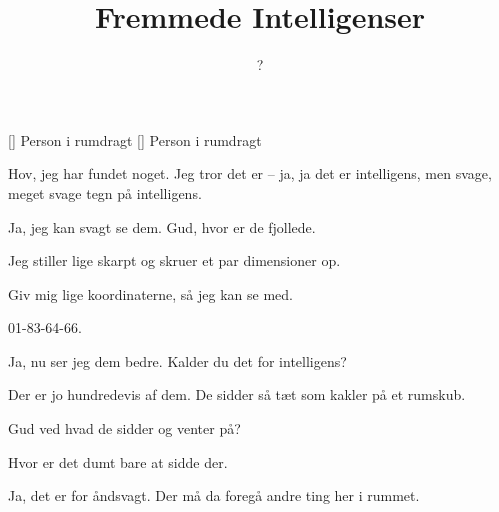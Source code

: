 \documentclass[a4paper,11pt]{article}
\title{Fremmede Intelligenser}
\author{?}
\begin{document}
\maketitle

\begin{roles}
  [] Person i rumdragt
  [] Person i rumdragt
\end{roles}

\begin{sketch}


   Hov, jeg har fundet noget.  Jeg tror det er -- ja, ja det
  er intelligens, men svage, meget svage tegn på intelligens.

   Ja, jeg kan svagt se dem.  Gud, hvor er de fjollede.

   Jeg stiller lige skarpt og skruer et par dimensioner op.


   Giv mig lige koordinaterne, så jeg kan se med.

   01-83-64-66.

   Ja, nu ser jeg dem bedre.  Kalder du det for intelligens?

   Der er jo hundredevis af dem.   De sidder så tæt som kakler på et rumskub.

   Gud ved hvad de sidder og venter på?

   Hvor er det dumt bare at sidde der.

   Ja, det er for åndsvagt.  Der må da foregå andre ting her i rummet.


\end{sketch}
\end{document}
